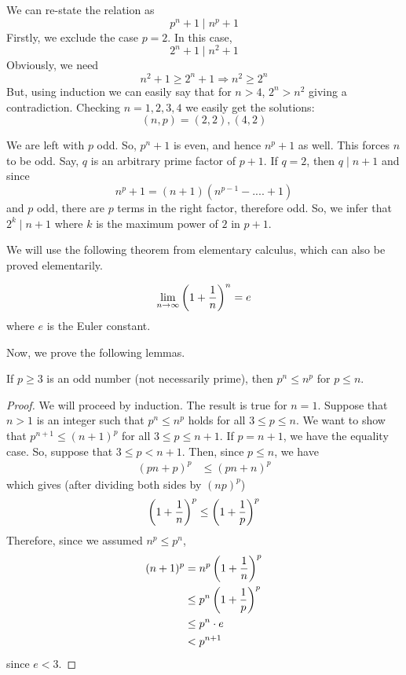 \begin{solution}
	We can re-state the relation as \[p^n+1\mid n^p+1\]
	Firstly, we exclude the case $p=2$. In this case, \[2^n+1\mid n^2+1\]
	Obviously, we need \[n^2+1\ge2^n+1\Rightarrow n^2\ge2^n\]
	But, using induction we can easily say that for $n>4$, $2^n>n^2$ giving a contradiction. Checking $n=1,2,3,4$ we easily get the solutions: \[(n,p)=(2,2), (4,2)\]

	We are left with $p$ odd. So, $p^n+1$ is even, and hence $n^p+1$ as well. This forces $n$ to be odd. Say, $q$ is an arbitrary prime factor of $p+1$. If $q=2$, then $q\mid n+1$ and since \[n^p+1=(n+1)(n^{p-1}-....+1)\]
	and $p$ odd, there are $p$ terms in the right factor, therefore odd. So, we infer that $2^k\mid n+1$ where $k$ is the maximum power of $2$ in $p+1$.

	We will use the following theorem from elementary calculus, which can also be proved elementarily.

	\begin{theorem}
		\[\lim\limits_{n\to\infty}\left(1+\frac{1}{n}\right)^{n}=e\]
		where $e$ is the Euler constant.
	\end{theorem}

	Now, we prove the following lemmas.
	\begin{lemma}\label{lem:aditya-generalized}
		If $p \geq 3$ is an odd number (not necessarily prime), then $p^n\le n^p$ for $p\le n$.
	\end{lemma}

	\begin{proof}[Proof]
		We will proceed by induction. The result is true for $n=1$. Suppose that $n>1$ is an integer such that $p^n \leq n^p$ holds for all $3 \leq p \leq n$. We want to show that $p^{n+1} \leq (n+1)^p$ for all $3 \leq p \leq n+1$. If $p=n+1$, we have the equality case. So, suppose that $3 \leq p < n+1$. Then, since $p\le n$, we have
			\begin{align*}
				(pn+p)^p
					& \le (pn+n)^p
			\end{align*}
		which gives (after dividing both sides by $(np)^p$)
			\begin{align*}
				\left(1 + \frac{1}{n}\right)^p \leq  \left(1 + \frac{1}{p}\right)^p
			\end{align*}
		Therefore, since we assumed $n^p \leq p^n$,
			\begin{align*}
				(n+1)^p & = n^p\left(1+\frac{1}{n}\right)^p\\
						&\leq p^{n}\left(1+\frac{1}{p}\right)^p\\
						& \le p^n\cdot e\\
						& < p^{n+1}
			\end{align*}
	since $e<3$.
\end{proof}


\end{solution}
